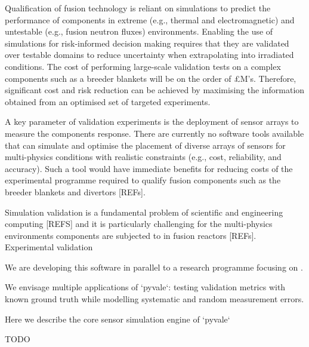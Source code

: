 \documentclass[11pt, a4paper, oneside, onecolumn]{article}
\begin{document}
Qualification of fusion technology is reliant on simulations to predict the performance of components in extreme (e.g., thermal and electromagnetic) and untestable (e.g., fusion neutron fluxes) environments. Enabling the use of simulations for risk-informed decision making requires that they are validated over testable domains to reduce uncertainty when extrapolating into irradiated conditions. The cost of performing large-scale validation tests on a complex components such as a breeder blankets will be on the order of £M's. Therefore, significant cost and risk reduction can be achieved by maximising the information obtained from an optimised set of targeted experiments.

A key parameter of validation experiments is the deployment of sensor arrays to measure the components response. There are currently no software tools available that can simulate and optimise the placement of diverse arrays of sensors for multi-physics conditions with realistic constraints (e.g., cost, reliability, and accuracy). Such a tool would have immediate benefits for reducing costs of the experimental programme required to qualify fusion components such as the breeder blankets and divertors [REFs].

Simulation validation is a fundamental problem of scientific and engineering computing [REFS] and it is particularly challenging for the multi-physics environments components are subjected to in fusion reactors [REFs]. Experimental validation  

We are developing this software in parallel to a research programme focusing on .

We envisage multiple applications of `pyvale`: testing validation metrics with known ground truth while modelling systematic and random measurement errors.  

Here we describe the core sensor simulation engine of `pyvale`

  

TODO \cite{gaston_moose_2009}

\end{document}
